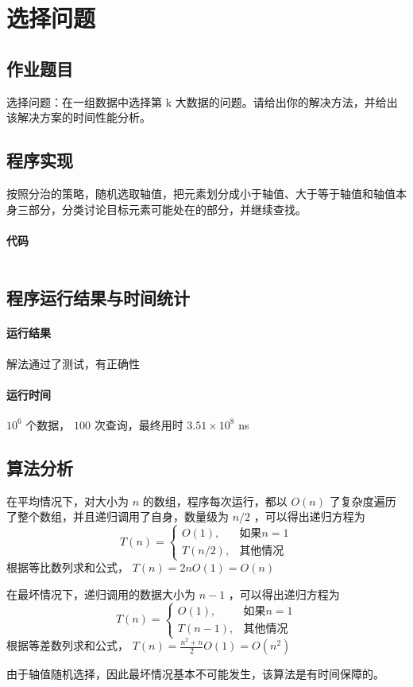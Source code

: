 \documentclass[UTF8]{ctexart}
\begin{document}
  \section{选择问题}
    \subsection{作业题目}
      选择问题：在一组数据中选择第 k 大数据的问题。请给出你的解决方法，并给出该解决方案的时间性能分析。
    \subsection{程序实现}
      按照分治的策略，随机选取轴值，把元素划分成小于轴值、大于等于轴值和轴值本身三部分，分类讨论目标元素可能处在的部分，并继续查找。
      \paragraph{代码}
      \inputminted{java}{src/Problem5.java}
    \subsection{程序运行结果与时间统计}
      \paragraph{运行结果} 解法通过了测试，有正确性
      \paragraph{运行时间} $ 10 ^ 6 $ 个数据， $ 100 $ 次查询，最终用时 $3.51 \times 10 ^ 8$ ns
    \subsection{算法分析}
      在平均情况下，对大小为 $n$ 的数组，程序每次运行，都以 $O(n)$ 了复杂度遍历了整个数组，并且递归调用了自身，数量级为 $n/2$ ，可以得出递归方程为
      \begin{equation}
        T(n) =
        \begin{cases}
          O(1), & \text{如果$n=1$} \\
          T(n/2), & \text{其他情况}
        \end{cases}
      \end{equation}
      根据等比数列求和公式， $T(n) = 2nO(1) = O(n)$

      在最坏情况下，递归调用的数据大小为 $n-1$ ，可以得出递归方程为
      \begin{equation}
        T(n) =
        \begin{cases}
          O(1), & \text{如果$n=1$} \\
          T(n - 1), & \text{其他情况}
        \end{cases}
      \end{equation}
      根据等差数列求和公式， $T(n) = \frac{n ^ 2 + n}{2} O(1) = O(n ^ 2)$

      由于轴值随机选择，因此最坏情况基本不可能发生，该算法是有时间保障的。
\end{document}
